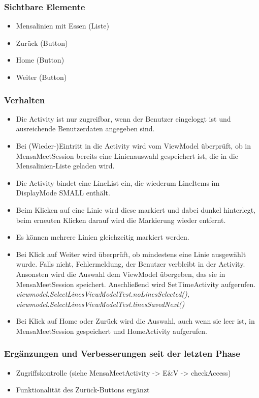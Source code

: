 \documentclass[a4paper]{scrreprt}
\begin{document}
\subsubsection{Sichtbare Elemente}
\begin{itemize}
\item Mensalinien mit Essen (Liste)
\item Zurück (Button)
\item Home (Button)
\item Weiter (Button)
\end{itemize}

\subsubsection{Verhalten}
\begin{itemize}
\item Die Activity ist nur zugreifbar, wenn der Benutzer eingeloggt ist und ausreichende Benutzerdaten angegeben sind.
\item Bei (Wieder-)Eintritt in die Activity wird vom ViewModel überprüft, ob in MensaMeetSession bereits eine Linienauswahl gespeichert ist, die in die Mensalinien-Liste geladen wird.
\item Die Activity bindet eine LineList ein, die wiederum LineItems im DisplayMode SMALL enthält.
\item Beim Klicken auf eine Linie wird diese markiert und dabei dunkel hinterlegt, beim erneuten Klicken darauf wird die Markierung wieder entfernt.
\item Es können mehrere Linien gleichzeitig markiert werden.
\item Bei Klick auf Weiter wird überprüft, ob mindestens eine Linie ausgewählt wurde. Falls nicht, Fehlermeldung, der Benutzer verbleibt in der Activity. Ansonsten wird die Auswahl dem ViewModel übergeben, das sie in MensaMeetSession speichert. Anschließend wird SetTimeActivity aufgerufen.\\
\textit{viewmodel.SelectLinesViewModelTest.noLinesSelected(),
viewmodel.SelectLinesViewModelTest.linesSavedNext()}
\item Bei Klick auf Home oder Zurück wird die Auswahl, auch wenn sie leer ist, in MensaMeetSession gespeichert und HomeActivity aufgerufen.

\end{itemize}

\subsubsection{Ergänzungen und Verbesserungen seit der letzten Phase}
\begin{itemize}
\item Zugriffskontrolle (siehe MensaMeetActivity -> E\&V -> checkAccess)
\item Funktionalität des Zurück-Buttons ergänzt
\end{itemize}
\end{document}
